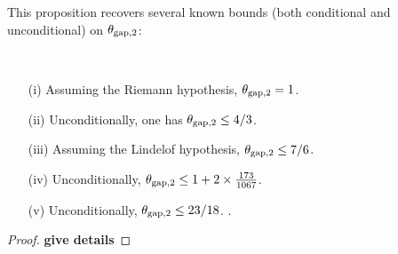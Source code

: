 This proposition recovers several known bounds (both conditional and unconditional) on $\theta_{\mathrm{gap},2}$:

\begin{corollary}\
    \begin{itemize}
    \item[(i)] Assuming the Riemann hypothesis, $\theta_{\mathrm{gap},2} = 1$.  \cite{selberg_1943}
    \item[(ii)] Unconditionally, one has $\theta_{\mathrm{gap},2} \leq 4/3$.  \cite{heath_brown_consecutive_I}
    \item[(iii)] Assuming the Lindelof hypothesis, $\theta_{\mathrm{gap},2} \leq 7/6$. \cite{heath_brown_consecutive_II}
    \item[(iv)] Unconditionally, $\theta_{\mathrm{gap},2} \leq 1 + 2 \times \frac{173}{1067}$. \cite[\S 7]{heath_brown_consecutive_II}
    \item[(v)] Unconditionally, $\theta_{\mathrm{gap},2} \leq 23/18$. \cite[Theorem 12.14]{ivic}.
\end{itemize}
\end{corollary}

\begin{proof} {\bf give details}
\end{proof}
